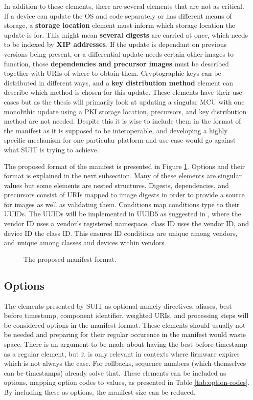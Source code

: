 \documentclass[0-thesis.tex]{subfiles}
\begin{document}
In addition to these elements, there are several elements that are not as critical. If a
device can update the OS and code separately or has different means of storage, a
\textbf{storage location} element must inform which storage location the update is for.
This might mean \textbf{several digests} are carried at once, which needs to be indexed by
\textbf{XIP addresses}. If the update is dependant on previous versions being present, or
a differential update needs certain other images to function, those \textbf{dependencies
and precursor images} must be described together with URIs of where to obtain them.
Cryptographic keys can be distributed in different ways, and a \textbf{key distribution
method} element can describe which method is chosen for this update. These elements have
their use cases but as the thesis will primarily look at updating a singular MCU with one
monolithic update using a PKI storage location, precursors, and key distribution method
are not needed. Despite this it is wise to include them in the format of the manifest as
it is supposed to be interoperable, and developing a highly specific mechanism for one
particular platform and use case would go against what SUIT is trying to achieve.

The proposed format of the manifest is presented in Figure \ref{fig:manifest-format}.
Options and their format is explained in the next subsection. Many of these elements are
singular values but some elements are nested structures. Digests, dependencies, and
precursors consist of URIs mapped to image digests in order to provide a source for images
as well as validating them. Conditions map conditions type to their UUIDs. The UUIDs will
be implemented in UUID5 as suggested in \parencite{suit-information-model}, where the
vendor ID uses a vendor's registered namespace, class ID uses the vendor ID, and device ID
the class ID. This ensures ID conditions are unique among vendors, and unique among
classes and devices within vendors.

\begin{figure}
    

    \caption{The proposed manifest format.}
    \label{fig:manifest-format}
\end{figure}

\subsection{Options}
\label{ssec:options}
The elements presented by SUIT as optional namely directives, aliases, best-before
timestamp, component identifier, weighted URIs, and processing steps will be considered
options in the manifest format. These elements should usually not be needed and preparing
for their regular occurence in the manifest would waste space. There is an argument to be
made about having the best-before timestamp as a regular element, but it is only relevant
in contexts where firmware expires which is not always the case. For rollbacks, sequence
numbers (which themselves can be timestamps) already solve that. These elements can be
included as options, mapping option codes to values, as presented in Table
\ref{tab:option-codes}. By including these as options, the manifest size can be reduced.
\end{document}
